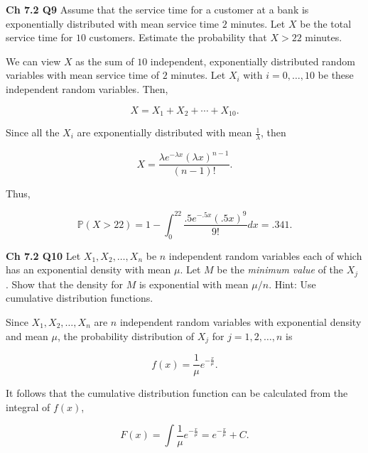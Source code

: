 \documentclass[12pt]{article}
\begin{document}
\vspace*{.5cm}
\noindent
\textbf{Ch 7.2 Q9} Assume that the service time for a customer at a bank is exponentially distributed with mean service time $2$ minutes. Let $X$ be the total service time for $10$ customers. Estimate the probability that $X > 22$ minutes.

\vspace*{.5cm}
\noindent
We can view $X$ as the sum of $10$ independent, exponentially distributed random variables with mean service time of $2$ minutes. Let $X_i$ with $i = 0, \ldots, 10$ be these independent random variables. Then,

\begin{equation*}
X = X_1 + X_2 + \cdots + X_{10}.
\end{equation*}

\noindent
Since all the $X_i$ are exponentially distributed with mean $\frac{1}{\lambda}$, then 

\begin{equation*}
X = \frac{\lambda e^{- \lambda x} (\lambda x)^{n-1}}{(n-1)!}.
\end{equation*}

\noindent
Thus,

\begin{equation*}
\mathbb{P}(X > 22) = 1 - \int_{0}^{22} \frac{.5 e^{- .5 x} (.5 x)^{9}}{9!} dx = .341.
\end{equation*}

\vspace*{.5cm}
\noindent
\textbf{Ch 7.2 Q10} Let $X_1, X_2, \ldots , X_n$ be $n$ independent random variables each of which has an exponential density with mean $\mu$. Let $M$ be the \textit{minimum value} of the $X_j$ . Show that the density for $M$ is exponential with mean $\mu / n$. Hint: Use cumulative distribution functions.

\vspace*{.5cm}
\noindent
Since $X_1, X_2, \ldots , X_n$ are $n$ independent random variables with exponential density and mean $\mu$, the probability distribution of $X_j$ for $j = 1, 2, \ldots, n$ is

\begin{equation*}
f(x) = \frac{1}{\mu} e^{-\frac{x}{\mu}}.
\end{equation*}

\noindent
It follows that the cumulative distribution function can be calculated from the integral of $f(x)$,

\begin{equation*}
F(x) = \int \frac{1}{\mu} e^{-\frac{x}{\mu}} = e^{-\frac{x}{\mu}} + C.
\end{equation*}
\end{document}
